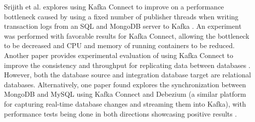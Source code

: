 Srijith et al. explores using Kafka Connect to improve on a performance bottleneck caused by using a fixed number of publisher threads when writing transaction logs from an SQL and MongoDB server to Kafka \cite{srijithkafkaconnectperformance}. An experiment was performed with favorable results for Kafka Connect, allowing the bottleneck to be decreased and \ac{CPU} and memory of running containers to be reduced. Another paper provides experimental evaluation of using Kafka Connect to improve the consistency and throughput for replicating data between databases \cite{adilaoptimizationkafkaconnect}. However, both the database source and integration database target are relational databases. Alternatively, one paper found explores the synchronization between MongoDB and MySQL using Kafka Connect and Debezium (a similar platform for capturing real-time database changes and streaming them into Kafka), with performance tests being done in both directions showcasing positive results \cite{sqlmongosync}.

